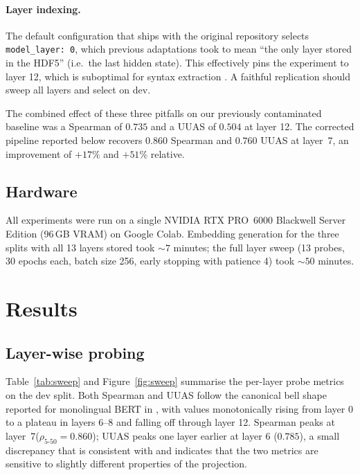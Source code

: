 \documentclass[11pt,a4paper]{article}
\newcommand{\layerbest}{7\xspace}
\begin{document}
\paragraph{Layer indexing.}
The default configuration that ships with the original repository
selects \texttt{model\_layer: 0}, which previous adaptations took to
mean ``the only layer stored in the HDF5'' (i.e.\ the last hidden
state). This effectively pins the experiment to layer 12, which is
suboptimal for syntax extraction \citep{hewitt2019structural}.
A faithful replication should sweep all layers and select on dev.

The combined effect of these three pitfalls on our previously
contaminated baseline was a Spearman of $0.735$ and a UUAS of
$0.504$ at layer 12. The corrected pipeline reported below
recovers $0.860$ Spearman and $0.760$ UUAS at layer~\layerbest, an
improvement of $+17\%$ and $+51\%$ relative.

\subsection{Hardware}

All experiments were run on a single NVIDIA RTX PRO~6000 Blackwell
Server Edition (96\,GB VRAM) on Google Colab. Embedding generation
for the three splits with all 13 layers stored took $\sim 7$ minutes;
the full layer sweep (13 probes, 30 epochs each, batch size 256,
early stopping with patience 4) took $\sim 50$ minutes.

\section{Results}
\label{sec:results}

\subsection{Layer-wise probing}

Table~\ref{tab:sweep} and Figure~\ref{fig:sweep} summarise the
per-layer probe metrics on the dev split. Both Spearman and UUAS
follow the canonical bell shape reported for monolingual BERT in
\citet{hewitt2019structural}, with values monotonically rising from
layer 0 to a plateau in layers 6--8 and falling off through layer 12.
Spearman peaks at layer~\layerbest ($\rho_{5\text{-}50} = 0.860$);
UUAS peaks one layer earlier at layer 6 ($0.785$), a small
discrepancy that is consistent with \citet{hewitt2019structural} and
indicates that the two metrics are sensitive to slightly different
properties of the projection.
\end{document}
